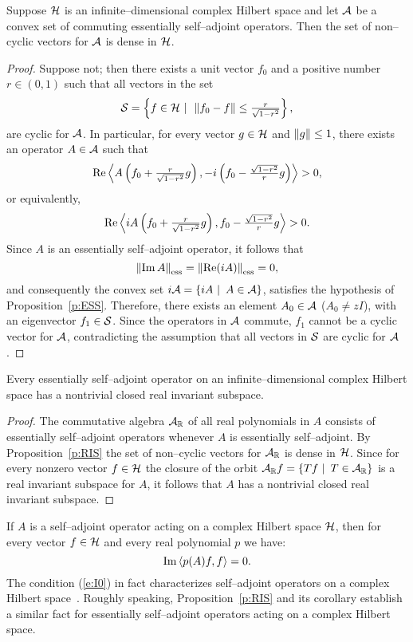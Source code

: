 \begin{prop}\label{p:RIS}
Suppose ${\cal H}$ is an infinite--dimensional complex Hilbert space and let ${\cal A}$
be a convex set of commuting essentially self--adjoint operators. Then the
set of non--cyclic vectors for ${\cal A}$ is dense in ${\cal H}$.
\end{prop}

\begin{proof}
Suppose not; then there exists a unit vector $f_0$ and a positive number
$r\in(0,1)$ such that all vectors in the set
\[  {\cal S}=\left\{f\in{\cal H}\,\,|\,\,\,\left\Vert f_0-f\right\Vert\leq\tfrac{r}{\sqrt{1-r^2}}\right\}, \]
are cyclic for ${\cal A}$. In particular, for every vector $g\in{\cal H}$ and
$\left\Vert g\right\Vert\leq1$, there exists an operator $A\in{\cal A}$ such that
\[ \operatorname{Re}\left<A\left(f_0+\tfrac{r}{\sqrt{1-r^2}}g\right),
          -i\left(f_0-\tfrac{\sqrt{1-r^2}}{r}g\right)\right> > 0, \]
or equivalently,
\[ \operatorname{Re}\left< i A\left(f_0+\tfrac{r}{\sqrt{1-r^2}}g\right),
                     f_0-\tfrac{\sqrt{1-r^2}}{r}g\right> > 0. \]
Since $A$ is an essentially self--adjoint operator, it follows that
\[ \essnorm{\IM{A}}=\essnorm{\RE(i{A})}=0, \]
and consequently the convex set $i{\cal A}=\left\{i{A}\,\,|\,\,\,A\in{\cal A}\right\}$, satisfies
the hypothesis of Proposition~\ref{p:ESS}. Therefore, there exists an element
$A_0\in{\cal A}$ ($A_0\neq{z}I$), with an eigenvector $f_1\in{\cal S}$. Since the
operators in ${\cal A}$ commute, $f_1$ cannot be a cyclic vector for ${\cal A}$,
contradicting the assumption that all vectors in ${\cal S}$ are cyclic for ${\cal A}$.
\end{proof}

\begin{cor}[V.I.\,Lomonosov, 1992]
Every essentially self--adjoint operator on an infinite--dimensional complex
Hilbert space has a nontrivial closed real invariant subspace.
\end{cor}

\begin{proof}
The commutative algebra ${\cal A}_{\mathbb R}$ of all real polynomials in $A$ consists
of essentially self--adjoint operators whenever $A$ is essentially
self--adjoint. By Proposition~\ref{p:RIS} the set of non--cyclic vectors for
${\cal A}_{\mathbb R}$ is dense in ${\cal H}$. Since for every nonzero vector $f\in{\cal H}$ the
closure of the orbit ${\cal A}_{\mathbb R}f=\left\{T{f}\,\,|\,\,\,T\in{\cal A}_{\mathbb R}\right\}$ is a
real invariant subspace for $A$, it follows that $A$ has a nontrivial closed
real invariant subspace.
\end{proof}

\begin{rem}
If $A$ is a self--adjoint operator acting on a complex Hilbert space ${\cal H}$,
then for every vector $f\in{\cal H}$ and every real polynomial $p$ we have:
\begin{equation} \label{e:I0}
  \IM\seq{p(A){f},f}=0.
\end{equation}
The condition (\ref{e:I0}) in fact characterizes self--adjoint operators on a
complex Hilbert space~\cite[p.~103]{KR83}. Roughly speaking,
Proposition~\ref{p:RIS} and its corollary establish a similar fact for
essentially self--adjoint operators acting on a complex Hilbert space.
\end{rem}

